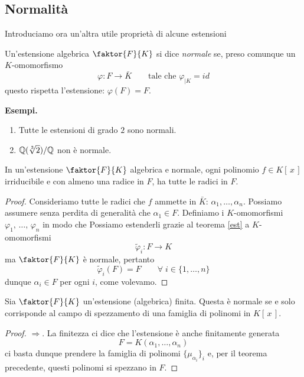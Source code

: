\subsection{Normalità}
\begin{multicols}{2}
Introduciamo ora un'altra utile proprietà di alcune estensioni

\begin{definition}[Normalità]
	Un'estensione algebrica $ \faktor{F}{K} $ si dice \emph{normale} se, preso comunque un $ K $-omomorfismo
	\[ \varphi \colon F \to \bar{K} \qquad\text{tale che } \varphi_{|K} = id \]
	questo rispetta l'estensione: $ \varphi(F) = F $.
\end{definition}

\textbf{Esempi.}
\begin{enumerate}
	\item Tutte le estensioni di grado $ 2 $ sono normali.
	\item $ {\mathbb{Q}(\sqrt[3]{2})}/{\mathbb{Q}} $ non è normale.
\end{enumerate}

\begin{theorem}[normale]
	In un'estensione $ \faktor{F}{K} $ algebrica e normale, ogni polinomio $ f \in K[\,x\,] $ irriducibile e con almeno una radice in $ F $, ha tutte le radici in $ F $.
\end{theorem}
\begin{proof}
	Consideriamo tutte le radici che $ f $ ammette in $ \bar{K} $: $ \alpha_1, \dots, \alpha_n $. Possiamo assumere senza perdita di generalità che $ \alpha_1 \in F $. Definiamo i $ K $-omomorfismi $ \varphi_1,\, \dots,\, \varphi_n $ in modo che
	Possiamo estenderli grazie al teorema \ref{est} a $ K $-omomorfismi
	\[ \tilde{\varphi}_i \colon F \to K \] 
	ma $ \faktor{F}{K} $ è normale, pertanto 
	$$  \tilde{\varphi}_i(F) = F \qquad\forall \; i \in \{1, \dots, n\} $$
	dunque $ \alpha_i \in F $ per ogni $ i $, come volevamo.
	
\end{proof}

\begin{theorem}\label{carnorm}
	Sia $ \faktor{F}{K} $ un'estensione (algebrica) finita. Questa è normale se e solo corrisponde al campo di spezzamento di una famiglia di polinomi in $ K[\,x\,] $.
\end{theorem}
\begin{proof}
	$ \Rightarrow$. La finitezza ci dice che l'estensione è anche finitamente generata
	 \[ F = K(\alpha_1, \dots, \alpha_n ) \]
	ci basta dunque prendere la famiglia di polinomi $ \{\mu_{\alpha_i} \}_{i} $ e, per il teorema precedente, questi polinomi si spezzano in $ F $.
	

\end{proof}
\end{multicols}
